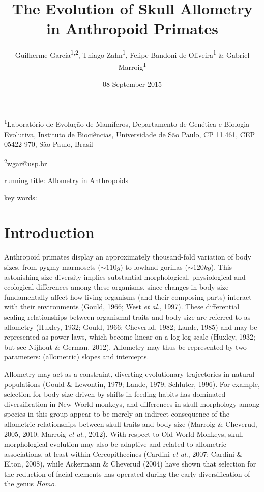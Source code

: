 \documentclass[12pt,]{article}
\title{The Evolution of Skull Allometry in Anthropoid Primates}
\author{Guilherme Garcia\textsuperscript{1,2}, Thiago Zahn\textsuperscript{1},
Felipe Bandoni de Oliveira\textsuperscript{1} \& Gabriel
Marroig\textsuperscript{1}}
\date{08 September 2015}
\begin{document}
\maketitle


\linenumbers
\modulolinenumbers[2]

\onehalfspacing

\textsuperscript{1}Laboratório de Evolução de Mamíferos, Departamento de
Genética e Biologia Evolutiva, Instituto de Biociências, Universidade de
São Paulo, CP 11.461, CEP 05422-970, São Paulo, Brasil

\textsuperscript{2}\href{mailto:wgar@usp.br}{wgar@usp.br}

running title: Allometry in Anthropoids

key words:

\section{Introduction}\label{introduction}

Anthropoid primates display an approximately thousand-fold variation of
body sizes, from pygmy marmosets ($\sim 110g$) to lowland gorillas
($\sim 120kg$). This astonishing size diversity implies substantial
morphological, physiological and ecological differences among these
organisms, since changes in body size fundamentally affect how living
organisms (and their composing parts) interact with their environments
(Gould, 1966; West \emph{et al.}, 1997). These differential scaling
relationships between organismal traits and body size are referred to as
allometry (Huxley, 1932; Gould, 1966; Cheverud, 1982; Lande, 1985) and
may be represented as power laws, which become linear on a log-log scale
(Huxley, 1932; but see Nijhout \& German, 2012). Allometry may thus be
represented by two parameters: (allometric) slopes and intercepts.

Allometry may act as a constraint, diverting evolutionary trajectories
in natural populations (Gould \& Lewontin, 1979; Lande, 1979; Schluter,
1996). For example, selection for body size driven by shifts in feeding
habits has dominated diversification in New World monkeys, and
differences in skull morphology among species in this group appear to be
merely an indirect consequence of the allometric relationships between
skull traits and body size (Marroig \& Cheverud, 2005, 2010; Marroig
\emph{et al.}, 2012). With respect to Old World Monkeys, skull
morphological evolution may also be adaptive and related to allometric
associations, at least within Cercopithecines (Cardini \emph{et al.},
2007; Cardini \& Elton, 2008), while Ackermann \& Cheverud (2004) have
shown that selection for the reduction of facial elements has operated
during the early diversification of the genus \emph{Homo}.
\end{document}
